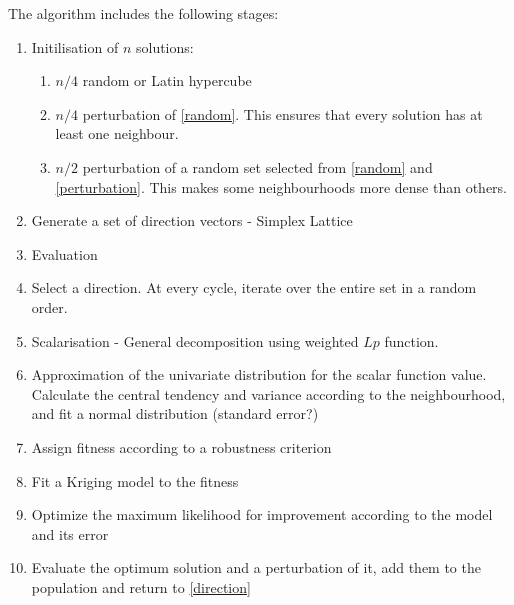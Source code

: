 \documentclass[10pt]{llncs}
\begin{document}
The algorithm includes the following stages:
\begin{enumerate}
\item Initilisation of $n$ solutions:
	\begin{enumerate}
	\item \label{random} $n/4$ random or Latin hypercube
	\item \label{perturbation} $n/4$ perturbation of \ref{random}. This ensures that every solution has at least one neighbour.
	\item $n/2$ perturbation of a random set selected from \ref{random} and \ref{perturbation}. This makes some neighbourhoods more dense than others.
	\end{enumerate}
\item Generate a set of direction vectors - Simplex Lattice
\item Evaluation
\item \label{direction} Select a direction. At every cycle, iterate over the entire set in a random order.
\item Scalarisation - General decomposition using weighted $Lp$ function.
\item Approximation of the univariate distribution for the scalar function value. Calculate the central tendency and variance according to the neighbourhood, and fit a normal distribution (standard error?)
\item Assign fitness according to a robustness criterion
\item Fit a Kriging model to the fitness
\item Optimize the maximum likelihood for improvement according to the model and its error
\item Evaluate the optimum solution and a perturbation of it, add them to the population and return to \ref{direction}
\end{enumerate}
\end{document}
